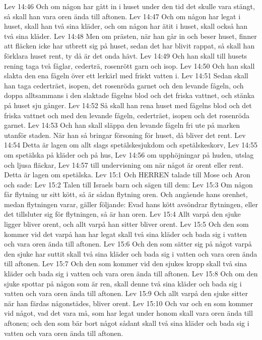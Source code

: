 Lev 14:46  Och om någon har gått in i huset under den tid det skulle vara stängt, så skall han vara oren ända till aftonen.
Lev 14:47  Och om någon har legat i huset, skall han två sina kläder, och om någon har ätit i huset, skall också han två sina kläder.
Lev 14:48  Men om prästen, när han går in och beser huset, finner att fläcken icke har utbrett sig på huset, sedan det har blivit rappat, så skall han förklara huset rent, ty då är det onda hävt.
Lev 14:49  Och han skall till husets rening taga två fåglar, cederträ, rosenrött garn och isop.
Lev 14:50  Och han skall slakta den ena fågeln över ett lerkärl med friskt vatten i.
Lev 14:51  Sedan skall han taga cederträet, isopen, det rosenröda garnet och den levande fågeln, och doppa alltsammans i den slaktade fågelns blod och det friska vattnet, och stänka på huset sju gånger.
Lev 14:52  Så skall han rena huset med fågelns blod och det friska vattnet och med den levande fågeln, cederträet, isopen och det rosenröda garnet.
Lev 14:53  Och han skall släppa den levande fågeln fri ute på marken utanför staden. När han så bringar försoning för huset, då bliver det rent.
Lev 14:54  Detta är lagen om allt slags spetälskesjukdom och spetälskeskorv,
Lev 14:55  om spetälska på kläder och på hus,
Lev 14:56  om upphöjningar på huden, utslag och ljusa fläckar,
Lev 14:57  till undervisning om när något är orent eller rent. Detta är lagen om spetälska.
Lev 15:1  Och HERREN talade till Mose och Aron och sade:
Lev 15:2  Talen till Israels barn och sägen till dem:
Lev 15:3  Om någon får flytning ur sitt kött, så är sådan flytning oren. Och angående hans orenhet, medan flytningen varar, gäller följande: Evad hans kött avsöndrar flytningen, eller det tillsluter sig för flytningen, så är han oren.
Lev 15:4  Allt varpå den sjuke ligger bliver orent, och allt varpå han sitter bliver orent.
Lev 15:5  Och den som kommer vid det varpå han har legat skall två sina kläder och bada sig i vatten och vara oren ända till aftonen.
Lev 15:6  Och den som sätter sig på något varpå den sjuke har suttit skall två sina kläder och bada sig i vatten och vara oren ända till aftonen.
Lev 15:7  Och den som kommer vid den sjukes kropp skall två sina kläder och bada sig i vatten och vara oren ända till aftonen.
Lev 15:8  Och om den sjuke spottar på någon som är ren, skall denne två sina kläder och bada sig i vatten och vara oren ända till aftonen.
Lev 15:9  Och allt varpå den sjuke sitter när han färdas någonstädes, bliver orent.
Lev 15:10  Och var och en som kommer vid något, vad det vara må, som har legat under honom skall vara oren ända till aftonen; och den som bär bort något sådant skall två sina kläder och bada sig i vatten och vara oren ända till aftonen.

